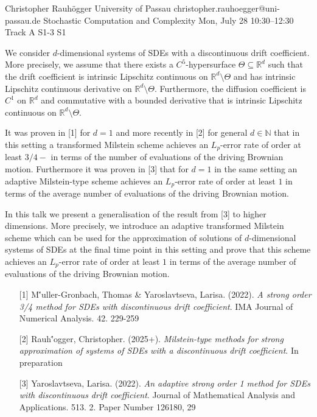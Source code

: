 \begin{talk}
  {Christopher Rauh\"ogger}%
  {University of Passau}%
  {christopher.rauhoegger@uni-passau.de}%
  {Stochastic Computation and Complexity}%
  {}%
  {}%
  {Mon, July 28 10:30–12:30 Track A}%
  {S1-3}%
  {S1}%
				
			
We consider $d$-dimensional systems of SDEs with a discontinuous drift coefficient. More precisely,
we assume that there exists a $C^{5}$-hypersurface
$\Theta\subseteq \mathbb{R}^{d}$ such that the drift coefficient is intrinsic Lipschitz continuous on $\mathbb{R}^{d}\setminus \Theta$ and has intrinsic Lipschitz continuous derivative on $\mathbb{R}^{d}\setminus \Theta$.
Furthermore, the diffusion coefficient is $C^{1}$ on $\mathbb{R}^{d}$ and commutative with a bounded derivative that is intrinsic Lipschitz continuous on $\mathbb{R}^{d}\setminus \Theta$.

It was proven in [1] for $d = 1$ and more recently in [2] for general $d \in \mathbb{N}$ that in this setting a transformed Milstein scheme achieves an $L_{p}$-error rate of order at least $3/4-$ in terms of the number of evaluations of the
driving Brownian motion.
Furthermore it was proven in [3] that for $d = 1$ in the same setting an adaptive Milstein-type scheme achieves an $L_{p}$-error rate of order at least $1$ in terms of the average number of evaluations of the driving Brownian motion. 

In this talk we present a generalisation of the result from [3] to higher dimensions. More precisely, we introduce an adaptive transformed Milstein scheme which can be used for the approximation of solutions of $d$-dimensional systems of SDEs at the final time point in this setting and
prove that this scheme achieves an $L_{p}$-error rate of order at least $1$ in terms of the average number of evaluations of the
driving Brownian motion.

\medskip

\begin{enumerate}
	\item[{[1]}] M\''{u}ller-Gronbach, Thomas \& Yaroslavtseva, Larisa. (2022). {\it A strong order 3/4 method for {SDE}s with discontinuous drift
		coefficient}. IMA Journal of Numerical Analysis. 42. 229-259
	\item[{[2]}] Rauh\''ogger, Christopher. (2025+). {\it Milstein-type methods for strong approximation of systems of SDEs with a discontinuous drift coefficient}. In preparation
	\item[{[3]}] Yaroslavtseva, Larisa. (2022). {\it An adaptive strong order 1 method for {SDE}s with
		discontinuous drift coefficient}. Journal of Mathematical Analysis and Applications. 513. 2. Paper Number 126180, 29
\end{enumerate}

\end{talk}

